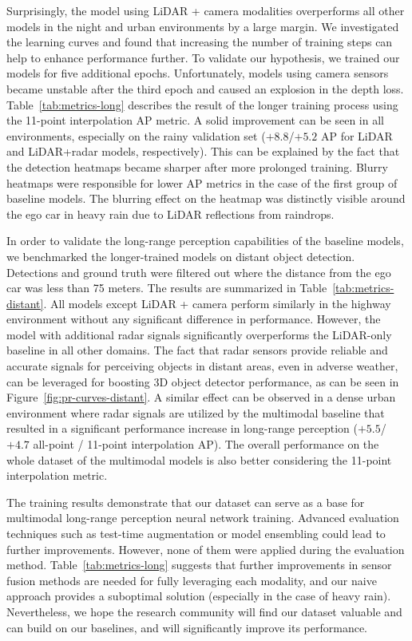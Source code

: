 \documentclass{article}
\begin{document}
Surprisingly, the model using LiDAR + camera modalities overperforms all other models in the night and urban environments by a large margin. We investigated the learning curves and found that increasing the number of training steps can help to enhance performance further. To validate our hypothesis, we trained our models for five additional epochs. Unfortunately, models using camera sensors became unstable after the third epoch and caused an explosion in the depth loss. Table~\ref{tab:metrics-long} describes the result of the longer training process using the 11-point interpolation AP metric. A solid improvement can be seen in all environments, especially on the rainy validation set ($+8.8$/$+5.2$ AP for LiDAR and LiDAR+radar models, respectively). This can be explained by the fact that the detection heatmaps became sharper after more prolonged training. Blurry heatmaps were responsible for lower AP metrics in the case of the first group of baseline models. The blurring effect on the heatmap was distinctly visible around the ego car in heavy rain due to LiDAR reflections from raindrops.

In order to validate the long-range perception capabilities of the baseline models, we benchmarked the longer-trained models on distant object detection. Detections and ground truth were filtered out where the distance from the ego car was less than 75 meters. The results are summarized in Table~\ref{tab:metrics-distant}. All models except LiDAR + camera perform similarly in the highway environment without any significant difference in performance. However, the model with additional radar signals significantly overperforms the LiDAR-only baseline in all other domains. The fact that radar sensors provide reliable and accurate signals for perceiving objects in distant areas, even in adverse weather, can be leveraged for boosting 3D object detector performance, as can be seen in Figure~\ref{fig:pr-curves-distant}. A similar effect can be observed in a dense urban environment where radar signals are utilized by the multimodal baseline that resulted in a significant performance increase in long-range perception ($+5.5$/$+4.7$ all-point / 11-point interpolation AP). The overall performance on the whole dataset of the multimodal models is also better considering the 11-point interpolation metric. 

The training results demonstrate that our dataset can serve as a base for multimodal long-range perception neural network training. Advanced evaluation techniques such as test-time augmentation or model ensembling could lead to further improvements. However, none of them were applied during the evaluation method. Table~\ref{tab:metrics-long} suggests that further improvements in sensor fusion methods are needed for fully leveraging each modality, and our naive approach provides a suboptimal solution (especially in the case of heavy rain). Nevertheless, we hope the research community will find our dataset valuable and can build on our baselines, and will significantly improve its performance.
\end{document}
